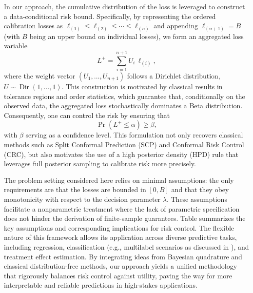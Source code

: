 \documentclass{article} %
\begin{document}
In our approach, the cumulative distribution of the loss is leveraged to construct a data-conditional risk bound. Specifically, by representing the ordered calibration losses as $\ell_{(1)} \leq \ell_{(2)} \leq \cdots \leq \ell_{(n)}$ and appending $\ell_{(n+1)} = B$ (with $B$ being an upper bound on individual losses), we form an aggregated loss variable
\[
L^+ = \sum_{i=1}^{n+1} U_i \, \ell_{(i)},
\]
where the weight vector $(U_1,\ldots,U_{n+1})$ follows a Dirichlet distribution, $U \sim \operatorname{Dir}(1, \dots, 1)$. This construction is motivated by classical results in tolerance regions and order statistics, which guarantee that, conditionally on the observed data, the aggregated loss stochastically dominates a Beta distribution. Consequently, one can control the risk by ensuring that
\[
\Pr(L^+ \leq \alpha) \geq \beta,
\]
with $\beta$ serving as a confidence level. This formulation not only recovers classical methods such as Split Conformal Prediction (SCP) and Conformal Risk Control (CRC), but also motivates the use of a high posterior density (HPD) rule that leverages full posterior sampling to calibrate risk more precisely.

The problem setting considered here relies on minimal assumptions: the only requirements are that the losses are bounded in $[0,B]$ and that they obey monotonicity with respect to the decision parameter $\lambda$. These assumptions facilitate a nonparametric treatment where the lack of parametric specification does not hinder the derivation of finite-sample guarantees. Table summarizes the key assumptions and corresponding implications for risk control. The flexible nature of this framework allows its application across diverse predictive tasks, including regression, classification (e.g., multilabel scenarios as discussed in \cite{cabezas2025epistemicuncertaintyconformalscores}), and treatment effect estimation. By integrating ideas from Bayesian quadrature and classical distribution-free methods, our approach yields a unified methodology that rigorously balances risk control against utility, paving the way for more interpretable and reliable predictions in high-stakes applications.
\end{document}
